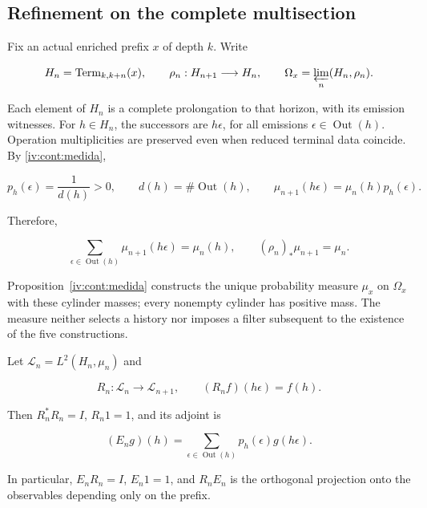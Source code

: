 \subsection{Refinement on the complete multisection}

Fix an actual enriched prefix \(x\) of depth \(k\). Write

\[
H_n=\operatorname{Term}_{k,k+n}(x),\qquad
\rho_n:H_{n+1}\longrightarrow H_n,
\qquad \Omega_x=\varprojlim_n(H_n,\rho_n).
\]

Each element of \(H_n\) is a complete prolongation to that horizon, with its emission witnesses. For \(h\in H_n\), the successors are \(h\epsilon\), for all emissions \(\epsilon\in\operatorname{Out}(h)\). Operation multiplicities are preserved even when reduced terminal data coincide. By \cref{iv:cont:medida},

\[
p_h(\epsilon)=\frac1{d(h)}>0,\qquad
d(h)=\#\operatorname{Out}(h),\qquad
\mu_{n+1}(h\epsilon)=\mu_n(h)p_h(\epsilon).
\]

Therefore,

\begin{equation}
\sum_{\epsilon\in\operatorname{Out}(h)}\mu_{n+1}(h\epsilon)=\mu_n(h),
\qquad (\rho_n)_*\mu_{n+1}=\mu_n.
\label{nuc01:eq:1}
\end{equation}

Proposition~\ref{iv:cont:medida} constructs the unique probability measure \(\mu_x\) on \(\Omega_x\) with these cylinder masses; every nonempty cylinder has positive mass. The measure neither selects a history nor imposes a filter subsequent to the existence of the five constructions.

\begin{proposition}
\label{nuc01:pullback}

Let \(\mathscr L_n=L^2(H_n,\mu_n)\) and

\[
R_n:\mathscr L_n\longrightarrow\mathscr L_{n+1},\qquad
(R_nf)(h\epsilon)=f(h).
\]

Then \(R_n^*R_n=I\), \(R_n1=1\), and its adjoint is

\begin{equation}
(E_ng)(h)=\sum_{\epsilon\in\operatorname{Out}(h)}p_h(\epsilon)g(h\epsilon).
\label{nuc01:eq:2}
\end{equation}

In particular, \(E_nR_n=I\), \(E_n1=1\), and \(R_nE_n\) is the orthogonal projection onto the observables depending only on the prefix.
\end{proposition}

